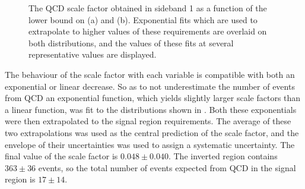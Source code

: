 \begin{figure}

  \caption{The QCD scale factor obtained in sideband 1 as a function of the lower bound on \jetmetdphi (a) and \METsig (b). Exponential fits which are used to extrapolate to higher values of these requirements are overlaid on both distributions, and the values of these fits at several representative values are displayed.}
  \label{fig:parkedqcdsfvar}
\end{figure}

The behaviour of the scale factor with each variable is compatible with both an exponential or linear decrease. So as to not underestimate the number of events from \ac{QCD} an exponential function, which yields slightly larger scale factors than a linear function, was fit to the distributions shown in . Both these exponentials were then extrapolated to the signal region requirements. The average of these two extrapolations was used as the central prediction of the scale factor, and the envelope of their uncertainties was used to assign a systematic uncertainty. The final value of the scale factor is $0.048\pm 0.040$. The inverted region contains $363\pm 36$ events, so the total number of events expected from \ac{QCD} in the signal region is $17\pm 14$.

